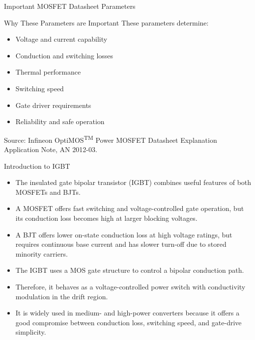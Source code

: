 \begin{frame}{Important MOSFET Datasheet Parameters}
\begin{block}{Why These Parameters are Important}
\small
These parameters determine:
\begin{itemize}
    \item Voltage and current capability
    \item Conduction and switching losses
    \item Thermal performance
    \item Switching speed
    \item Gate driver requirements
    \item Reliability and safe operation
\end{itemize}
\end{block}
\small
Source: Infineon OptiMOS\textsuperscript{TM} Power MOSFET Datasheet Explanation Application Note, AN 2012-03. 
\end{frame}

\begin{frame}{Introduction to IGBT}
\begin{itemize}
    \item The insulated gate bipolar transistor (IGBT) combines useful features of both MOSFETs and BJTs.
    \item A MOSFET offers fast switching and voltage-controlled gate operation, but its conduction loss becomes high at larger blocking voltages.
    \item A BJT offers lower on-state conduction loss at high voltage ratings, but requires continuous base current and has slower turn-off due to stored minority carriers.
    \item The IGBT uses a MOS gate structure to control a bipolar conduction path.
    \item Therefore, it behaves as a voltage-controlled power switch with conductivity modulation in the drift region.
    \item It is widely used in medium- and high-power converters because it offers a good compromise between conduction loss, switching speed, and gate-drive simplicity.
\end{itemize}
\end{frame}


